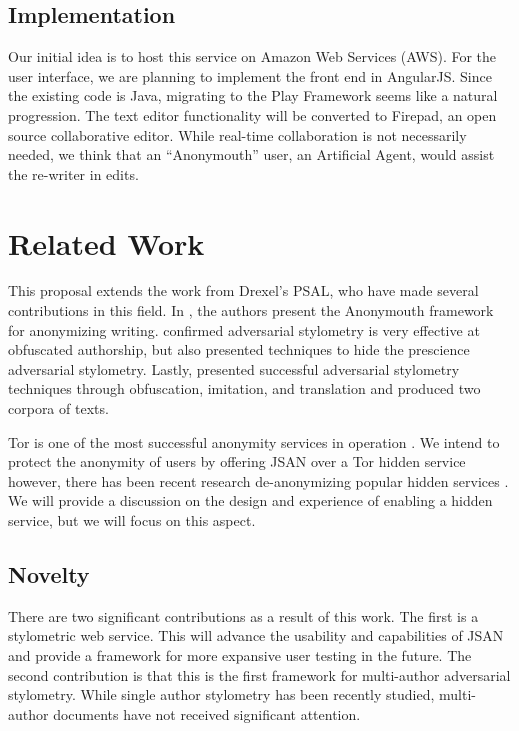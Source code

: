 \documentclass[letterpaper]{article}
\begin{document}
\subsection{Implementation}

Our initial idea is to host this service on Amazon Web Services
(AWS).  For the user interface, we are planning to implement the front
end in AngularJS.  Since the existing code is Java, migrating to the
Play Framework seems like a natural progression.  The text editor
functionality will be converted to Firepad, an open source
collaborative editor.  While real-time collaboration is not
necessarily needed, we think that an ``Anonymouth'' user, an
Artificial Agent, would assist the re-writer in edits.


\section*{Related Work}\label{sec:related}
This proposal extends the work from Drexel's PSAL, who have made
several contributions in this field.  In
\cite{conf/pet/McDonaldACSG12}, the authors present the Anonymouth
framework for anonymizing writing.
\cite{Afroz:2012:DHF:2310656.2310711} confirmed adversarial stylometry
is very effective at obfuscated authorship, but also presented
techniques to hide the prescience adversarial stylometry.  Lastly,
\cite{journals/tissec/BrennanAG12} presented successful adversarial
stylometry techniques through obfuscation, imitation, and translation
and produced two corpora of texts.

Tor is one of the most successful anonymity services in
operation \cite{Dingledine04tor:the}.  We intend to protect the
anonymity of users by offering JSAN over a Tor hidden service
however, there has been recent research de-anonymizing popular hidden
services \cite{oakland2013-trawling}.  We will provide a discussion on
the design and experience of enabling a hidden service, but we will
focus on this aspect.

\subsection{Novelty}\label{sec:novelty}

There are two significant contributions as a result of this work.  The
first is a stylometric web service.  This will advance the usability
and capabilities of JSAN and provide a framework for more expansive
user testing in the future.  The second contribution is that this is
the first framework for multi-author adversarial stylometry.  While
single author stylometry has been recently studied, multi-author
documents have not received significant attention.
\end{document}
